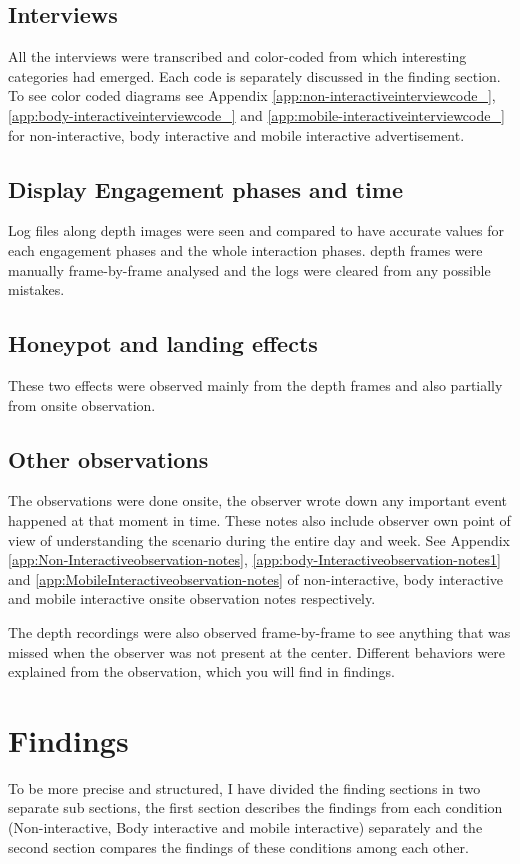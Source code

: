 \subsection {Interviews} 
All the interviews were transcribed and color-coded from which interesting categories had emerged. Each code is separately discussed in the finding section. To see color coded diagrams see Appendix \ref{app:non-interactiveinterviewcode_}, \ref{app:body-interactiveinterviewcode_} and \ref{app:mobile-interactiveinterviewcode_} for non-interactive, body interactive and mobile interactive advertisement.



\subsection {Display Engagement phases and time} 
Log files along depth images were seen and compared to have accurate values for each engagement phases and the whole interaction phases. depth frames were manually frame-by-frame analysed and the logs were cleared from any possible mistakes.

\subsection {Honeypot and landing effects}
These two effects were observed mainly from the depth frames and also partially from onsite observation.

\subsection {Other observations}
The observations were done onsite, the observer wrote down any important event happened at that moment in time. These notes also include observer own point of view of understanding the scenario during the entire day and week. See Appendix \ref{app:Non-Interactiveobservation-notes}, \ref{app:body-Interactiveobservation-notes1} and \ref{app:MobileInteractiveobservation-notes} of non-interactive, body interactive and mobile interactive onsite observation notes respectively. 

The depth recordings were also observed frame-by-frame to see anything that was missed when the observer was not present at the center. Different behaviors were explained from the observation, which you will find in findings.


\section{Findings}
To be more precise and structured, I have divided the finding sections in two separate sub sections, the first section describes the findings from each condition (Non-interactive, Body interactive and mobile interactive) separately and the second section compares the findings of these conditions among each other.



